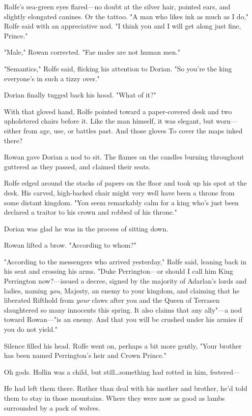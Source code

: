 Rolfe's sea-green eyes flared---no doubt at the silver hair, pointed ears, and slightly elongated canines.
Or the tattoo.
"A man who likes ink as much as I do," Rolfe said with an appreciative nod.
"I think you and I will get along just fine, Prince."

"Male," Rowan corrected.
"Fae males are not human men."

"Semantics," Rolfe said, flicking his attention to Dorian.
"So you're the king everyone's in such a tizzy over."

Dorian finally tugged back his hood.
"What of it?"

With that gloved hand, Rolfe pointed toward a paper-covered desk and two upholstered chairs before it.
Like the man himself, it was elegant, but worn--- either from age, use, or battles past.
And those gloves 
To cover the maps inked there?

Rowan gave Dorian a nod to sit.
The flames on the candles burning throughout guttered as they passed, and claimed their seats.

Rolfe edged around the stacks of papers on the floor and took up his spot at the desk.
His carved, high-backed chair might very well have been a throne from some distant kingdom.
"You seem remarkably calm for a king who's just been declared a traitor to his crown and robbed of his throne."

Dorian was glad he was in the process of sitting down.

Rowan lifted a brow.
"According to whom?"

"According to the messengers who arrived yesterday," Rolfe said, leaning back in his seat and crossing his arms.
"Duke Perrington---or should I call him King Perrington now?---issued a decree, signed by the majority of Adarlan's lords and ladies, naming \emph{you}, Majesty, an enemy to your kingdom, and claiming that he liberated Rifthold from \emph{your} claws after you and the Queen of Terrasen slaughtered so many innocents this spring.
It also claims that any ally"---a nod toward Rowan---"is an enemy.
And that you will be crushed under his armies if you do not yield."

Silence filled his head.
Rolfe went on, perhaps a bit more gently, "Your brother has been named Perrington's heir and Crown Prince."

Oh gods.
Hollin was a child, but still\ldots something had rotted in him, festered---

He had left them there.
Rather than deal with his mother and brother, he'd told them to stay in those mountains.
Where they were now as good as lambs surrounded by a pack of wolves.

